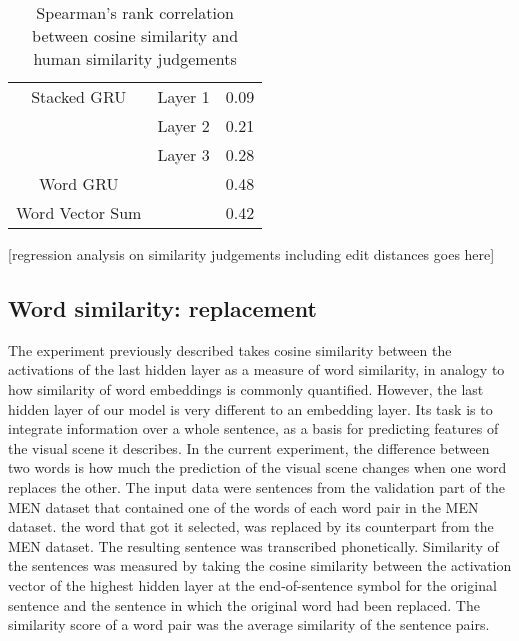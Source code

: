 \begin{table}[]
	\centering
	\begin{tabular}{ccc}
		{\sc Stacked GRU} & Layer 1 & 0.09 \\
		& Layer 2 & 0.21 \\
		& Layer 3 & 0.28 \\
			\hline
		{\sc Word GRU} & & 0.48 \\
			\hline
		{\sc Word Vector Sum} & & 0.42
	\end{tabular}
	\caption{Spearman's rank correlation between cosine similarity and human similarity judgements} %
\end{table}

[regression analysis on similarity judgements including edit distances goes here]

\subsection{Word similarity: replacement}
The experiment previously described takes cosine similarity between the activations of the last hidden layer as a measure of word similarity, in analogy to how similarity of word embeddings is commonly quantified. However, the last hidden layer of our model is very different to an embedding layer. Its task is to integrate information over a whole sentence, as a basis for predicting features of the visual scene it describes. In the current experiment, the difference between two words is how much the prediction of the visual scene changes when one word replaces the other. %
The input data were sentences from the validation part of the MEN dataset that contained one of the words of each word pair in the MEN dataset. %
the word that got it selected, was replaced by its counterpart from the MEN dataset. The resulting sentence was transcribed phonetically. Similarity of the sentences was measured by taking the cosine similarity between the activation vector of the highest hidden layer at the end-of-sentence symbol for the original sentence and the sentence in which the original word had been replaced. The similarity score of a word pair was the average similarity of the sentence pairs. %

